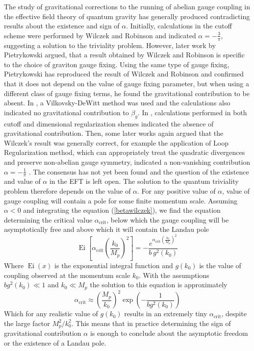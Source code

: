 \documentclass[11pt, a4paper]{article}
\begin{document}
The study of gravitational corrections to the running of abelian gauge coupling in the effective field theory of quantum gravity has generally produced contradicting results about the existence and sign of $\alpha$.
Initially, calculations in the cutoff scheme were performed by Wilczek and Robinson \cite{wilczek} and indicated
$\alpha = - \frac{3}{\pi} $, suggesting a solution to the triviality problem.
However, later work by Pietrykowski \cite{pietrykowski} argued, that a result obtained by Wilczek and Robinson is specific to the choice of graviton gauge fixing.
Using the same type of gauge fixing, Pietrykowski has reproduced the result of Wilczek and Robinson and confirmed that it does not depend on the value of gauge fixing parameter, but when using a different class of gauge fixing terms, he found the gravitational contribution to be absent.
In \cite{toms}, a Vilkovsky-DeWitt method was used and the calculations also indicated no gravitational contribution to $\beta_g$.
In \cite{absence}, calculations performed in both cutoff and dimensional regularization shemes indicated the absence of gravitational contribution.
Then, some later works again argued that the Wilczek's result was generally correct, for example the application of Loop Regularization method, which can appropriately treat the quadratic divergences and preserve non-abelian gauge symmetry,
indicated a non-vanishing contribution $\alpha = -\frac{1}{\pi} $ \cite{tang}.
The consensus has not yet been found and the question of the existence and value of $\alpha$ in the EFT is left open.
The solution to the quantum triviality problem therefore depends on the value of $\alpha$.
For any positive value of $\alpha$, value of gauge coupling will contain a pole for some finite momentum scale.
Assuming $\alpha < 0$ and integrating the equation (\ref{betawilczek}), we find the equation determining the critical value $\alpha_{\text{crit}}$, below which the gauge coupling will be asymptotically free and above which it will contain the Landau pole
\begin{equation}
\operatorname{Ei}\left[\alpha_{\text{crit}} \left( \frac{k_0}{M_p} \right)^2 \right]
    = - \frac{e^{\alpha_{\text{crit}} \left( \frac{k_0}{M_p} \right)^2}}{b \ g^2(k_0)}%
\end{equation}
Where $\operatorname{Ei}(x)$ is the exponential integral function and $g(k_0)$ is the value of coupling observed at the momentum scale $k_0$. With the assumptions $b g^2(k_0) \ll 1$ and $k_0 \ll M_p$ the solution to this equation is approximately
\begin{equation}
    \alpha_{\text{crit}} \approx \left( \frac{M_p}{k_0} \right)^2 \operatorname{exp}{\left( - \frac{1}{b g^2(k_0)} \right)}
\end{equation}
Which for any realistic value of $g(k_0)$ results in an extremely tiny $\alpha_{\text{crit}}$, despite the large factor $M_p^2/k_0^2$.
This means that in practice determining the sign of gravitational contribution $\alpha$ is enough to conclude about the asymptotic freedom or the existence of a Landau pole.
\end{document}
